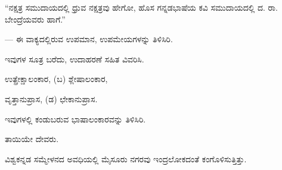 \vspace{2.5pt plus 3pt minus 0.5pt}\noindent\hspace*{1.2em}\hspace{0.55em}“ನಕ್ಷತ್ರ ಸಮುದಾಯದಲ್ಲಿ ಧ್ರುವ ನಕ್ಷತ್ರವು ಹೇಗೋ, ಹೊಸ ಗನ್ನಡಭಾಷೆಯ ಕವಿ ಸಮುದಾಯದಲ್ಲಿ ದ. ರಾ. ಬೇಂದ್ರೆಯವರು ಹಾಗೆ.”\par

\noindent\hfill{\fontsize{9.5pt}{12.5pt}\selectfont\color{kbvgrey}— ಈ ವಾಕ್ಯದಲ್ಲಿರುವ ಉಪಮಾನ, ಉಪಮೇಯಗಳನ್ನು ತಿಳಿಸಿರಿ.}\par\vspace{3pt plus 2pt}

\vspace{2.5pt plus 3pt minus 0.5pt}\noindent\hspace*{1.2em}\hspace{0.55em}ಇವುಗಳ ಸೂತ್ರ ಬರೆದು, ಉದಾಹರಣೆ ಸಹಿತ ವಿವರಿಸಿ.\par

\vspace{2.5pt plus 3pt minus 0.5pt}\noindent\hspace*{1.2em}\hspace{0.55em}ಉತ್ಪ್ರೇಕ್ಷಾಲಂಕಾರ, (ಬ) ಶ್ಲೇಷಾಲಂಕಾರ,\par

\vspace{2.5pt plus 3pt minus 0.5pt}\noindent\hspace*{1.2em}\hspace{0.55em}ವೃತ್ತಾನುಪ್ರಾಸ, (ಡ) ಛೇಕಾನುಪ್ರಾಸ.\par

\vspace{2.5pt plus 3pt minus 0.5pt}\noindent\hspace*{1.2em}\hspace{0.55em}ಇವುಗಳಲ್ಲಿ ಕಂಡುಬರುವ ಭಾಷಾಲಂಕಾರವನ್ನು ತಿಳಿಸಿರಿ.\par

\vspace{2.5pt plus 3pt minus 0.5pt}\noindent\hspace*{1.2em}\hspace{0.55em}ತಾಯಿಯೇ ದೇವರು.\par

\vspace{2.5pt plus 3pt minus 0.5pt}\noindent\hspace*{1.2em}\hspace{0.55em}ವಿಶ್ವಕನ್ನಡ ಸಮ್ಮೇಳನದ ಅವಧಿಯಲ್ಲಿ ಮೈಸೂರು ನಗರವು ಇಂದ್ರಲೋಕದಂತೆ ಕಂಗೊಳಿಸುತ್ತಿತ್ತು.\par

